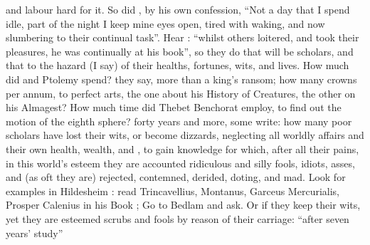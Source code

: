 and labour hard for it. So did \Seneca{}, by his own confession,
 \enquote{Not a day that I spend
idle, part of the night I keep mine eyes open, tired with waking, and now
slumbering to their continual task}. Hear \Tully{} : \enquote{whilst
others loitered, and took their pleasures, he was continually at his book}, so
they do that will be scholars, and that to the hazard (I say) of their healths,
fortunes, wits, and lives. How much did \Aristotle{} and Ptolemy spend?  they say, more than a king's ransom; how many crowns per annum,
to perfect arts, the one about his History of Creatures, the other on his
Almagest? How much time did Thebet Benchorat employ, to find out the motion of
the eighth sphere? forty years and more, some write: how many poor scholars
have lost their wits, or become dizzards, neglecting all worldly affairs and
their own health, wealth,  and , to gain knowledge for
which, after all their pains, in this world's esteem they are accounted
ridiculous and silly fools, idiots, asses, and (as oft they are) rejected,
contemned, derided, doting, and mad. Look for examples in Hildesheim
: read Trincavellius,
 Montanus,
 Garceus
 Mercurialis,
 Prosper
Calenius in his Book ;
Go to Bedlam and ask. Or if they keep their wits, yet they are esteemed scrubs
and fools by reason of their carriage: \enquote{after seven years' study}


